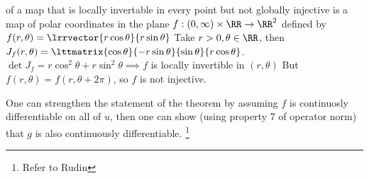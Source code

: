 \begin{exam} of a map that is locally invertable in every point but not globally injective is a map of polar coordinates in the plane $f:(0,\infty) \times \RR \rightarrow \RR^2$ defined by $f(r, \theta) = \lrrvector{r \cos\theta}{r \sin\theta}$
  Take $r > 0, \theta \in \RR$, then $J_f(r, \theta) = \lttmatrix{\cos\theta}{-r\sin\theta}{\sin\theta}{r\cos\theta}$.
  $\det{J_f} = r\cos^2\theta + r\sin^2\theta \implies f$ is locally invertible in $(r, \theta)$
  But $f(r,\theta) = f(r, \theta + 2\pi)$, so $f$ is not injective.
\end{exam}

\begin{rem}
  One can strengthen the statement of the theorem by assuming $f$ is continuosly differentiable on all of $u$, then one can show (using property 7 of operator norm) that $g$ is also continuously differentiable. \footnote{Refer to Rudin}
\end{rem}
